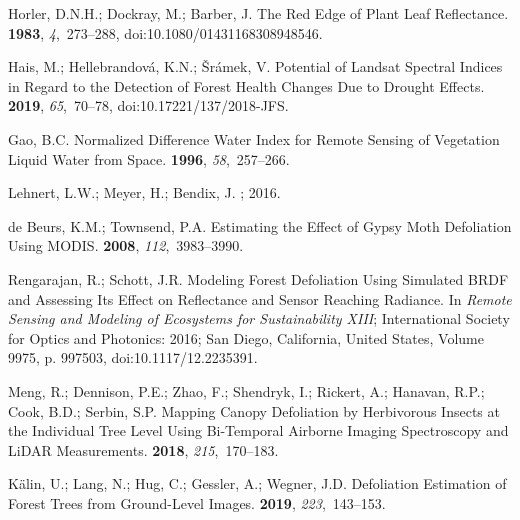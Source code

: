 \documentclass[remotesensing,article,accept,moreauthors,pdftex]{Definitions/mdpi}
\begin{document}
\begin{thebibliography}{999}
Horler, D.N.H.; Dockray, M.; Barber, J.
\newblock The Red Edge of Plant Leaf Reflectance.
 {\bf 1983}, {\em
  4},~273--288, doi:10.1080/01431168308948546.

Hais, M.; Hellebrandov{\'a}, K.N.; {\v S}r{\'a}mek, V.
\newblock Potential of {{Landsat}} Spectral Indices in Regard to the Detection
  of Forest Health Changes Due to Drought Effects.
 {\bf 2019}, {\em 65},~70--78, doi:10.17221/137/2018-JFS.

Gao, B.C.
 Normalized Difference Water Index for Remote
  Sensing of Vegetation Liquid Water from Space.
 {\bf 1996}, {\em 58},~257--266.

Lehnert, L.W.; Meyer, H.; Bendix, J.
;  2016.

{de Beurs}, K.M.; Townsend, P.A.
\newblock Estimating the Effect of Gypsy Moth Defoliation Using {{MODIS}}.
 {\bf 2008}, {\em
  112},~3983--3990.

Rengarajan, R.; Schott, J.R.
\newblock Modeling Forest Defoliation Using Simulated {{BRDF}} and Assessing
  Its Effect on Reflectance and Sensor Reaching Radiance.
\newblock  In \emph{Remote {{Sensing}} and {{Modeling}} of {{Ecosystems}} for
  {{Sustainability XIII}}}; {International Society for Optics and Photonics}:
  2016; San Diego, California, United States, Volume 9975, p. 997503, doi:10.1117/12.2235391.

Meng, R.; Dennison, P.E.; Zhao, F.; Shendryk, I.; Rickert, A.; Hanavan, R.P.;
  Cook, B.D.; Serbin, S.P.
\newblock Mapping Canopy Defoliation by Herbivorous Insects at the Individual
  Tree Level Using Bi-Temporal Airborne Imaging Spectroscopy and {{LiDAR}}
  Measurements.
 {\bf 2018}, {\em 215},~170--183.

K{\"a}lin, U.; Lang, N.; Hug, C.; Gessler, A.; Wegner, J.D.
\newblock Defoliation Estimation of Forest Trees from Ground-Level Images.
 {\bf 2019}, {\em 223},~143--153.


\end{thebibliography}
\end{document}
